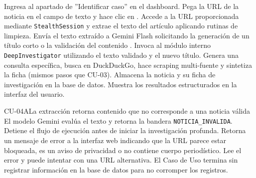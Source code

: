 \begin{UCtrayectoria}
	\UCpaso[\UCActor] Ingresa al apartado de ''Identificar caso'' en el dashboard.
	\UCpaso[\UCActor] Pega la URL de la noticia en el campo de texto y hace clic en .
	\UCpaso[\UCsist] Accede a la URL proporcionada mediante \texttt{StealthSession} y extrae el texto del artículo aplicando rutinas de limpieza.
	\UCpaso[\UCsist] Envía el texto extraído a Gemini Flash solicitando la generación de un título corto o la validación del contenido .
	\UCpaso[\UCsist] Invoca al módulo interno \texttt{DeepInvestigator} utilizando el texto validado y el nuevo título.
	\UCpaso[\UCsist] Genera una consulta específica, busca en DuckDuckGo, hace scraping multi-fuente y sintetiza la ficha (mismos pasos que CU-03).
	\UCpaso[\UCsist] Almacena la noticia y su ficha de investigación en la base de datos.
	\UCpaso[\UCsist] Muestra los resultados estructurados en la interfaz del usuario.
\end{UCtrayectoria}

\begin{UCtrayectoriaA}{CU-04}{A}{La extracción retorna contenido que no corresponde a una noticia válida}
	\UCpaso[\UCsist] El modelo Gemini evalúa el texto y retorna la bandera \texttt{NOTICIA\_INVALIDA}.
	\UCpaso[\UCsist] Detiene el flujo de ejecución antes de iniciar la investigación profunda.
	\UCpaso[\UCsist] Retorna un mensaje de error a la interfaz web indicando que la URL parece estar bloqueada, es un aviso de privacidad o no contiene cuerpo periodístico.
	\UCpaso[\UCActor] Lee el error y puede intentar con una URL alternativa.
	\UCpaso[] El Caso de Uso termina sin registrar información en la base de datos para no corromper los registros.
\end{UCtrayectoriaA}
